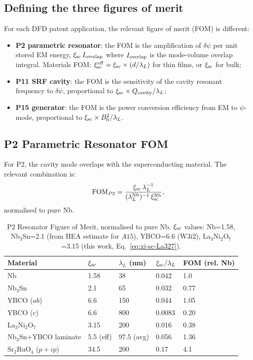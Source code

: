 \documentclass[11pt]{article}
\begin{document}
\subsection{Defining the three figures of merit}

For each DFD patent application, the relevant figure of merit (FOM) is
different:
\begin{itemize}
  \item \textbf{P2 parametric resonator}: the FOM is the amplification of
        $\delta\psi$ per unit stored EM energy, $\xi_{\rm sc}\,I_{\rm overlap}$
        where $I_{\rm overlap}$ is the mode-volume overlap integral. Materials
        FOM: $\xi_{\rm sc}^{\rm eff} = \xi_{\rm sc}\times(d/\lambda_L)$
        for thin films, or $\xi_{\rm sc}$ for bulk;
  \item \textbf{P11 SRF cavity}: the FOM is the sensitivity of the cavity
        resonant frequency to $\delta\psi$, proportional to
        $\xi_{\rm sc}\times Q_{\rm cavity}/\lambda_L$;
  \item \textbf{P15 generator}: the FOM is the power conversion efficiency
        from EM to $\psi$-mode, proportional to $\xi_{\rm sc}\times B_0^2/\lambda_L$.
\end{itemize}

\subsection{P2 Parametric Resonator FOM}

For P2, the cavity mode overlaps with the superconducting material.
The relevant combination is:
\begin{equation}
\text{FOM}_{P2} = \frac{\xi_{\rm sc}\,\lambda_L^{-1}}{(\lambda_L^{\rm Nb})^{-1}\,\xi_{\rm sc}^{\rm Nb}},
\label{eq:FOM-P2}
\end{equation}
normalised to pure Nb.

\begin{table}[h]
\centering
\caption{P2 Resonator Figure of Merit, normalised to pure Nb.
$\xi_{\rm sc}$ values: Nb=1.58, Nb$_3$Sn=2.1 (from HEA estimate for $A15$),
YBCO=6.6 (W3i2), La$_3$Ni$_2$O$_7$=3.15 (this work, Eq.~\ref{eq:xi-sc-La327}).}
\label{tab:FOM-P2}
\begin{tabular}{lllll}
\toprule
Material & $\xi_{\rm sc}$ & $\lambda_L$ (nm) & $\xi_{\rm sc}/\lambda_L$ & FOM (rel. Nb) \\
\midrule
Nb & 1.58 & 38 & 0.042 & 1.0 \\
Nb$_3$Sn & 2.1 & 65 & 0.032 & 0.77 \\
YBCO ($ab$) & 6.6 & 150 & 0.044 & 1.05 \\
YBCO ($c$) & 6.6 & 800 & 0.0083 & 0.20 \\
La$_3$Ni$_2$O$_7$ & 3.15 & 200 & 0.016 & 0.38 \\
Nb$_3$Sn+YBCO laminate & 5.5 (eff) & 97.5 (avg) & 0.056 & 1.36 \\
Sr$_2$RuO$_4$ ($p+ip$) & 34.5 & 200 & 0.17 & 4.1 \\
\bottomrule
\end{tabular}
\end{table}
\end{document}
